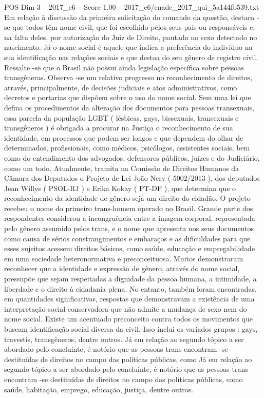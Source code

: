 \begin{textsample}{POS Dim 3 – 2017\_c6 – Score 1.00 – 2017\_c6/enade\_2017\_qui\_5a144fb539.txt}
Em relação à discussão da primeira solicitação do comando da questão, destaca -se que todos têm nome civil, que foi escolhido pelos seus pais ou responsáveis e, na falta deles, por autorização do Juiz de Direito, pautado no sexo detectado no nascimento.
Já o nome social é aquele que indica a preferência do indivíduo na sua identificação nas relações sociais e que destoa do seu gênero de registro civil.
Ressalte -se que o Brasil não possui ainda legislação específica sobre pessoas transgêneras.
Observa -se um relativo progresso no reconhecimento de direitos, através, principalmente, de decisões judiciais e atos administrativos, como decretos e portarias que dispõem sobre o uso do nome social.
Sem uma lei que defina os procedimentos da alteração dos documentos para pessoas transexuais, essa parcela da população LGBT ( lésbicas, gays, bissexuais, transexuais e transgêneros ) é obrigada a procurar na Justiça o reconhecimento de sua identidade, em processos que podem ser longos e que dependem do olhar de determinados, profissionais, como médicos, psicólogos, assistentes sociais, bem como do entendimento dos advogados, defensores públicos, juízes e do Judiciário, como um todo.
Atualmente, tramita na Comissão de Direitos Humanos da Câmara dos Deputados o Projeto de Lei João Nery ( 5002/2013 ), dos deputados Jean Willys ( PSOL-RJ ) e Erika Kokay ( PT-DF ), que determina que o reconhecimento da identidade de gênero seja um direito do cidadão.
O projeto recebeu o nome do primeiro trans-homem operado no Brasil.
Grande parte dos respondentes considerou a incongruência entre a imagem corporal, representada pelo gênero assumido pelos trans, e o nome que apresenta nos seus documentos como causa de sérios constrangimentos e embaraços e as dificuldades para que esses sujeitos acessem direitos básicos, como saúde, educação e empregabilidade em uma sociedade heteronormativa e preconceituosa.
Muitos demonstraram reconhecer que a identidade e expressão de gênero, através do nome social, pressupõe que sejam respeitadas a dignidade da pessoa humana, a intimidade, a liberdade e o direito à cidadania plena.
No entanto, também foram encontradas, em quantidades significativas, respostas que demonstravam a existência de uma interpretação social conservadora que não admite a mudança de sexo nem do nome social.
Existe um acentuado preconceito contra todos os movimentos que buscam identificação social diversa da civil.
Isso inclui os variados grupos : gays, travestis, transgêneros, dentre outros.
Já em relação ao segundo tópico a ser abordado pelo concluinte, é notório que as pessoas trans encontram -se destituídas de direitos no campo das políticas públicas, como Já em relação ao segundo tópico a ser abordado pelo concluinte, é notório que as pessoas trans encontram -se destituídas de direitos no campo das políticas públicas, como saúde, habitação, emprego, educação, justiça, dentre outros.

\end{textsample}
